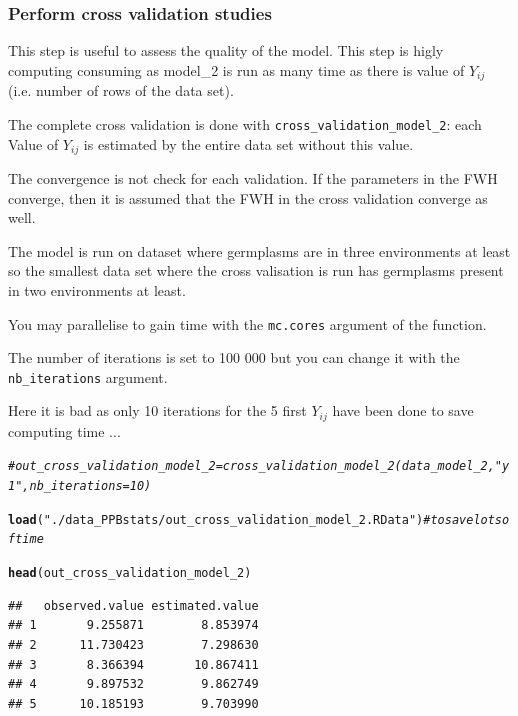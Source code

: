 \documentclass{article}\usepackage[]{graphicx}\usepackage[]{color}
\makeatletter
\newcommand{\hlstr}[1]{\textcolor[rgb]{0.192,0.494,0.8}{#1}}%
\newcommand{\hlcom}[1]{\textcolor[rgb]{0.678,0.584,0.686}{\textit{#1}}}%
\newcommand{\hlstd}[1]{\textcolor[rgb]{0.345,0.345,0.345}{#1}}%
\newcommand{\hlkwd}[1]{\textcolor[rgb]{0.737,0.353,0.396}{\textbf{#1}}}%
\newenvironment{kframe}{%
 \def\at@end@of@kframe{}%
 \ifinner\ifhmode%
  \def\at@end@of@kframe{\end{minipage}}%
  \begin{minipage}{\columnwidth}%
 \fi\fi%
 \def\FrameCommand##1{\hskip\@totalleftmargin \hskip-\fboxsep
 \colorbox{shadecolor}{##1}\hskip-\fboxsep
     \hskip-\linewidth \hskip-\@totalleftmargin \hskip\columnwidth}%
 \MakeFramed {\advance\hsize-\width
   \@totalleftmargin\z@ \linewidth\hsize
   \@setminipage}}%
 {\par\unskip\endMakeFramed%
 \at@end@of@kframe}
\newenvironment{knitrout}{}{} %
\makeatother
\begin{document}
\subsubsection{Perform cross validation studies}

This step is useful to assess the quality of the model.
This step is higly computing consuming as model\_2 is run as many time as there is value of $Y_{ij}$ (i.e. number of rows of the data set).

The complete cross validation is done with \texttt{cross\_validation\_model\_2}: 
each Value of $Y_{ij}$ is estimated by the entire data set without this value.

The convergence is not check for each validation. 
If the parameters in the FWH converge, then it is assumed that the FWH in the cross validation converge as well.

The model is run on dataset where germplasms are in three environments at least so the smallest data set where the cross valisation is run has germplasms present in two environments at least. 

You may parallelise to gain time with the \texttt{mc.cores} argument of the function.

The number of iterations is set to 100 000 but you can change it with the \texttt{nb\_iterations} argument.

Here it is bad as only 10 iterations for the 5 first $Y_{ij}$ have been done to save computing time ...

\begin{knitrout}
\color{fgcolor}\begin{kframe}
\begin{alltt}
\hlcom{# out_cross_validation_model_2 = cross_validation_model_2(data_model_2, "y1", nb_iterations = 10)}

\hlkwd{load}\hlstd{(}\hlstr{"./data_PPBstats/out_cross_validation_model_2.RData"}\hlstd{)} \hlcom{# to save lots of time}

\hlkwd{head}\hlstd{(out_cross_validation_model_2)}
\end{alltt}
\begin{verbatim}
##   observed.value estimated.value
## 1       9.255871        8.853974
## 2      11.730423        7.298630
## 3       8.366394       10.867411
## 4       9.897532        9.862749
## 5      10.185193        9.703990
\end{verbatim}
\end{kframe}
\end{knitrout}
\end{document}
